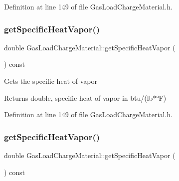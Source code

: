 Definition at line 149 of file Gas\+Load\+Charge\+Material.\+h.

\mbox{\label{class_gas_load_charge_material_a9a07e86938bb831e51ac3f53f696a3c3}} 
\subsubsection{\texorpdfstring{get\+Specific\+Heat\+Vapor()}{getSpecificHeatVapor()}\hspace{0.1cm}{\footnotesize\ttfamily [2/3]}}
{\footnotesize\ttfamily double Gas\+Load\+Charge\+Material\+::get\+Specific\+Heat\+Vapor (\begin{DoxyParamCaption}{ }\end{DoxyParamCaption}) const\hspace{0.3cm}{\ttfamily [inline]}}

Gets the specific heat of vapor \begin{DoxyReturn}{Returns}
double, specific heat of vapor in btu/(lb$\ast$°F) 
\end{DoxyReturn}


Definition at line 149 of file Gas\+Load\+Charge\+Material.\+h.

\mbox{\label{class_gas_load_charge_material_a9a07e86938bb831e51ac3f53f696a3c3}} 
\subsubsection{\texorpdfstring{get\+Specific\+Heat\+Vapor()}{getSpecificHeatVapor()}\hspace{0.1cm}{\footnotesize\ttfamily [3/3]}}
{\footnotesize\ttfamily double Gas\+Load\+Charge\+Material\+::get\+Specific\+Heat\+Vapor (\begin{DoxyParamCaption}{ }\end{DoxyParamCaption}) const\hspace{0.3cm}{\ttfamily [inline]}}

